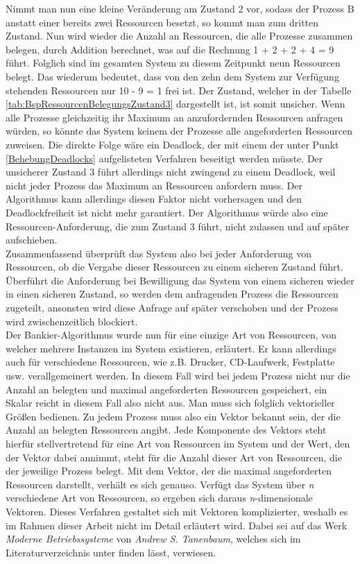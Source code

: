 \begin{description}
\begin{description}
								Nimmt man nun eine kleine Veränderung am Zustand 2 vor, sodass der Prozess B anstatt einer bereits zwei Ressourcen besetzt, so kommt man zum dritten Zustand. Nun wird wieder die Anzahl an Ressourcen, die alle Prozesse zusammen belegen, durch Addition berechnet, was auf die Rechnung 1 + 2 + 2 + 4 = 9 führt. Folglich sind im gesamten System zu diesem Zeitpunkt neun Ressourcen belegt. Das wiederum bedeutet, dass von den zehn dem System zur Verfügung stehenden Ressourcen nur 10 - 9 = 1 frei ist. Der Zustand, welcher in der Tabelle \ref{tab:BspRessourcenBelegungsZustand3} dargestellt ist, ist somit unsicher. Wenn alle Prozesse gleichzeitig ihr Maximum an anzufordernden Ressourcen anfragen würden, so könnte das System keinem der Prozesse alle angeforderten Ressourcen zuweisen. Die direkte Folge wäre ein Deadlock, der mit einem der unter Punkt \ref{BehebungDeadlocks} aufgelisteten Verfahren beseitigt werden müsste. Der unsicherer Zustand 3 führt allerdings nicht zwingend zu einem Deadlock, weil nicht jeder Prozess das Maximum an Ressourcen anfordern muss. Der Algorithmus kann allerdings diesen Faktor nicht vorhersagen und den Deadlockfreiheit ist nicht mehr garantiert. Der Algorithmus würde also eine Ressourcen-Anforderung, die zum Zustand 3 führt, nicht zulassen und auf später aufschieben.\\
								Zusammenfassend überprüft das System also bei jeder Anforderung von Ressourcen, ob die Vergabe dieser Ressourcen zu einem sicheren Zustand führt. Überführt die Anforderung bei Bewilligung das System von einem sicheren wieder in einen sicheren Zustand, so werden dem anfragenden Prozess die Ressourcen zugeteilt, ansonsten wird diese Anfrage auf später verschoben und der Prozess wird zwischenzeitlich blockiert.\\
								Der Bankier-Algorithmus wurde nun für eine einzige Art von Ressourcen, von welcher mehrere Instanzen im System existieren, erläutert. Er kann allerdings auch für verschiedene Ressourcen, wie z.B. Drucker, CD-Laufwerk, Festplatte usw. verallgemeinert werden. In diesem Fall wird bei jedem Prozess nicht nur die Anzahl an belegten und maximal angeforderten Ressourcen gespeichert, ein Skalar reicht in diesem Fall also nicht aus. Man muss sich folglich vektorieller Größen bedienen. Zu jedem Prozess muss also ein Vektor bekannt sein, der die Anzahl an belegten Ressourcen angibt. Jede Komponente des Vektors steht hierfür stellvertretend für eine Art von Ressourcen im System und der Wert, den der Vektor dabei annimmt, steht für die Anzahl dieser Art von Ressourcen, die der jeweilige Prozess belegt. Mit dem Vektor, der die maximal angeforderten Ressourcen darstellt, verhält es sich genauso. Verfügt das System über \textit{n} verschiedene Art von Ressourcen, so ergeben sich daraus \textit{n}-dimensionale Vektoren. Dieses Verfahren gestaltet sich mit Vektoren komplizierter, weshalb es im Rahmen dieser Arbeit nicht im Detail erläutert wird. Dabei sei auf das Werk \textit{Moderne Betriebssysteme} von \textit{Andrew S. Tanenbaum}, welches sich im Literaturverzeichnis unter \cite{ModerneBetriebssysteme} finden lässt, verwiesen.
							

\end{description}
\end{description}
